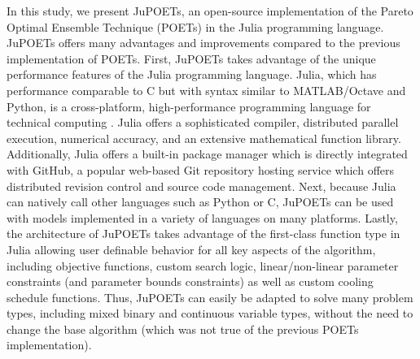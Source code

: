 \documentclass{bmcart}
\begin{document}
In this study, we present JuPOETs, an open-source implementation of the Pareto Optimal Ensemble Technique (POETs) in the Julia programming language.
JuPOETs offers many advantages and improvements compared to the previous implementation of POETs.
First, JuPOETs takes advantage of the unique performance features of the Julia programming language.
Julia, which has performance comparable to C but with syntax similar to MATLAB/Octave and Python, is a cross-platform, high-performance programming language for technical computing \cite{Julia}. Julia offers a sophisticated compiler, distributed parallel execution, numerical accuracy, and an extensive mathematical function library.
Additionally, Julia offers a built-in package manager which is directly integrated with GitHub, a popular web-based Git repository hosting service which offers distributed revision control and source code management.
Next, because Julia can natively call other languages such as Python or C, JuPOETs can be used with models implemented in a variety of languages on many platforms.
Lastly, the architecture of JuPOETs takes advantage of the first-class function type in Julia allowing user definable behavior for all key aspects of the algorithm, including objective functions, custom search logic, linear/non-linear parameter constraints (and parameter bounds constraints) as well as custom cooling schedule functions. Thus, JuPOETs can easily be adapted to solve many problem types, including mixed binary and continuous variable types, without the need to change the base algorithm (which was not true of the previous POETs implementation).
\end{document}
